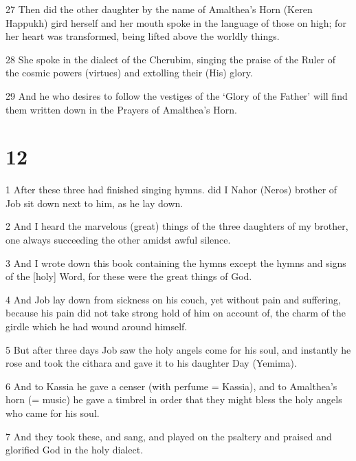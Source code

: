 \par 27 Then did the other daughter by the name of Amalthea’s Horn (Keren Happukh) gird herself and her mouth spoke in the language of those on high; for her heart was transformed, being lifted above the worldly things.

\par 28 She spoke in the dialect of the Cherubim, singing the praise of the Ruler of the cosmic powers (virtues) and extolling their (His) glory.

\par 29 And he who desires to follow the vestiges of the ‘Glory of the Father’ will find them written down in the Prayers of Amalthea’s Horn.

\chapter{12}

\par 1 After these three had finished singing hymns. did I Nahor (Neros) brother of Job sit down next to him, as he lay down.

\par 2 And I heard the marvelous (great) things of the three daughters of my brother, one always succeeding the other amidst awful silence.

\par 3 And I wrote down this book containing the hymns except the hymns and signs of the [holy] Word, for these were the great things of God.

\par 4 And Job lay down from sickness on his couch, yet without pain and suffering, because his pain did not take strong hold of him on account of, the charm of the girdle which he had wound around himself.

\par 5 But after three days Job saw the holy angels come for his soul, and instantly he rose and took the cithara and gave it to his daughter Day (Yemima).

\par 6 And to Kassia he gave a censer (with perfume = Kassia), and to Amalthea’s horn (= music) he gave a timbrel in order that they might bless the holy angels who came for his soul.

\par 7 And they took these, and sang, and played on the psaltery and praised and glorified God in the holy dialect.

